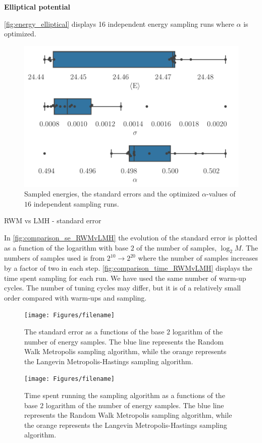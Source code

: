 \textbf{Elliptical potential}

\autoref{fig:energy_elliptical} displays 16 independent energy sampling runs where $\alpha$ is optimized. 

\begin{figure}[H]
\begin{center}\includegraphics[scale=0.5]{figures/aehoib_bp.pdf}
\end{center}
\caption{Sampled energies, the standard errors and the optimized $\alpha$-values of $16$ independent sampling runs.}
\label{fig:bp_aehoib}
\end{figure}

RWM vs LMH - standard error

In \autoref{fig:comparison_se_RWMvLMH} the evolution of the standard error is plotted as a function of the logarithm with base $2$ of the number of samples, $\log_2{M}$. The numbers of samples used is from $2^{10}\to2^{20}$ where the number of samples increases by a factor of two in each step. \autoref{fig:comparison_time_RWMvLMH} displays the time spent sampling for each run. We have used the same number of warm-up cycles. The number of tuning cycles may differ, but it is of a relatively small order compared with warm-ups and sampling. 

\begin{figure}[H]
\begin{center}\texttt{[image: Figures/filename]}
\end{center}
\caption{The standard error as a functions of the base $2$ logarithm of the number of energy samples. The blue line represents the Random Walk Metropolis sampling algorithm, while the orange represents the Langevin Metropolis-Hastings sampling algorithm.}
\label{fig:comparison_se_RWMvLMH}
\end{figure}

\begin{figure}[H]
\begin{center}\texttt{[image: Figures/filename]}
\end{center}
\caption{Time spent running the sampling algorithm as a functions of the base $2$ logarithm of the number of energy samples. The blue line represents the Random Walk Metropolis sampling algorithm, while the orange represents the Langevin Metropolis-Hastings sampling algorithm.}
\label{fig:comparison_time_RWMvLMH}
\end{figure}
